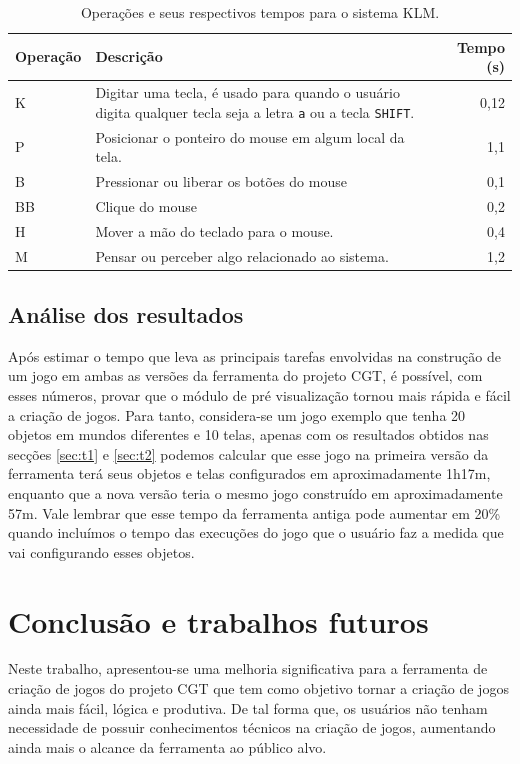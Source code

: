 \documentclass[12pt,oneside,openright,a4paper,english,brazil,sumario=tradicional]{abntex2}
\begin{document}
\begin{table}[p]
   \centering
   \begin{tabular}{| l | p{18em} | r |}
      \hline
      \textbf{Operação} & \textbf{Descrição} & \textbf{Tempo (s)} \\
      \hline
      K & Digitar uma tecla, é usado para quando o usuário digita qualquer tecla seja a letra \texttt{a} ou a tecla \texttt{SHIFT}.  & 0,12 \\
      P & Posicionar o ponteiro do mouse em algum local da tela.  & 1,1  \\
      B & Pressionar ou liberar os botões do mouse & 0,1 \\
      BB & Clique do mouse & 0,2 \\
      H & Mover a mão do teclado para o mouse. & 0,4 \\
      M & Pensar ou perceber algo relacionado ao sistema. & 1,2 \\
      \hline
   \end{tabular}
   \caption{Operações e seus respectivos tempos para o sistema KLM.}
   \label{table:klm-ops}
\end{table}

\section{Análise dos resultados}
Após estimar o tempo que leva as principais tarefas envolvidas na construção de um jogo em ambas as versões da ferramenta do projeto CGT, é possível, com esses números, provar que o módulo de pré visualização tornou mais rápida e fácil a criação de jogos. Para tanto, considera-se um jogo exemplo que tenha 20 objetos em mundos diferentes e 10 telas, apenas com os resultados obtidos nas secções \ref{sec:t1}  e \ref{sec:t2} podemos calcular que esse jogo na primeira versão da ferramenta terá seus objetos e telas configurados em aproximadamente 1h17m, enquanto que a nova versão teria o mesmo jogo construído em aproximadamente 57m. Vale lembrar que esse tempo da ferramenta antiga pode aumentar em 20\% quando incluímos o tempo das execuções do jogo que o usuário faz a medida que vai configurando esses objetos.

\chapter{Conclusão e trabalhos futuros}
\label{chap:conclcsao}

Neste trabalho, apresentou-se uma melhoria significativa para a ferramenta de criação de jogos do projeto CGT que tem como objetivo tornar a criação de jogos ainda mais fácil, lógica e produtiva. De tal forma que, os usuários não tenham necessidade de possuir conhecimentos técnicos na criação de jogos, aumentando ainda mais o alcance da ferramenta ao público alvo.
\end{document}
